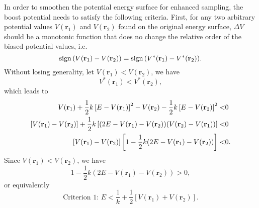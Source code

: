 In order to smoothen the potential energy surface for enhanced sampling, the boost potential needs to satisfy the following criteria. First, for any two arbitrary potential values $V(\mathbf{r}_1)$ and $V(\mathbf{r}_2)$ found on the original energy surface, $\Delta V$ should be a monotonic function that does no change the relative order of the biased potential values, i.e. 
\begin{equation}
	\operatorname{sign}{(V(\mathbf{r}_1)-V(\mathbf{r}_2))}=\operatorname{sign}{(V^\ast(\mathbf{r}_1)-V^\ast(\mathbf{r}_2))}.
\end{equation}
Without losing generality, let $V(\mathbf{r}_1)<V(\mathbf{r}_2)$, we have
\begin{equation}
	V^\ast(\mathbf{r}_1)<V^\ast(\mathbf{r}_2),
\end{equation}
which leads to
\begin{align}
    V(\mathbf{r}_1)+\frac{1}{2}k\left[E-V(\mathbf{r}_1)\right]^2-V(\mathbf{r}_2)-\frac{1}{2}k\left[E-V(\mathbf{r}_2)\right]^2<&0\notag\\
    \left[V(\mathbf{r}_1)-V(\mathbf{r}_2)\right]+\frac{1}{2}k\left[(2E-V(\mathbf{r}_1)-V(\mathbf{r}_2))(V(\mathbf{r}_2)-V(\mathbf{r}_1))\right]<&0\notag\\
    \left[V(\mathbf{r}_1)-V(\mathbf{r}_2)\right]\left[1-\frac{1}{2}k(2E-V(\mathbf{r}_1)-V(\mathbf{r}_2))\right]<&0.
\end{align}
Since $V(\mathbf{r}_1)<V(\mathbf{r}_2)$, we have
\begin{equation}
	1-\frac{1}{2}k(2E-V(\mathbf{r}_1)-V(\mathbf{r}_2))>0,
\end{equation}
or equivalently
\begin{equation}
	\text{Criterion 1: } E<\frac{1}{k}+\frac{1}{2}\left[V(\mathbf{r}_1)+V(\mathbf{r}_2)\right].
\end{equation}

